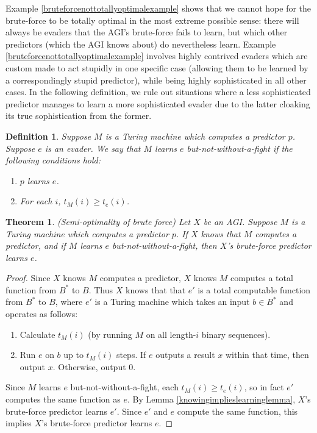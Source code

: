 \documentclass{article}
\newtheorem{definition}{Definition}
\newtheorem{theorem}{Theorem}
\begin{document}
Example \ref{bruteforcenottotallyoptimalexample} shows that we cannot
hope for the brute-force to be totally optimal in the most extreme possible sense:
there will always be evaders that the AGI's brute-force fails to learn, but which other
predictors (which the AGI knows about)
do nevertheless learn. Example \ref{bruteforcenottotallyoptimalexample} involves
highly contrived evaders which are custom made to act stupidly in one specific case
(allowing them to be learned by a correspondingly stupid predictor), while being
highly sophisticated in all other cases. In the following definition, we rule out
situations where a less sophisticated predictor manages to learn a
more sophisticated evader due to the latter cloaking its true sophistication from
the former.

\begin{definition}
    Suppose $M$ is a Turing machine which computes a predictor $p$.
    Suppose $e$ is an evader.
    We say that \emph{$M$ learns $e$ but-not-without-a-fight}
    if the following conditions hold:
    \begin{enumerate}
        \item $p$ learns $e$.
        \item For each $i$, $t_M(i)\geq t_e(i)$.
    \end{enumerate}
\end{definition}

\begin{theorem}
    (Semi-optimality of brute force)
    Let $X$ be an AGI.
    Suppose $M$ is a Turing machine which computes a predictor $p$.
    If $X$ knows that $M$ computes a predictor, and if $M$ learns $e$
    but-not-without-a-fight, then $X$'s brute-force predictor learns $e$.
\end{theorem}

\begin{proof}
    Since $X$ knows $M$ computes a predictor, $X$ knows $M$ computes a total
    function from $B^*$ to $B$. Thus $X$ knows that that $e'$ is a total
    computable function from $B^*$ to $B$, where $e'$ is a Turing machine which
    takes an input $b\in B^*$ and operates as follows:
    \begin{enumerate}
        \item
        Calculate $t_M(i)$ (by running $M$ on all length-$i$ binary sequences).
        \item
        Run $e$ on $b$ up to $t_M(i)$ steps. If $e$ outputs a result $x$ within that
        time, then output $x$. Otherwise, output $0$.
    \end{enumerate}
    Since $M$ learns $e$ but-not-without-a-fight, each $t_M(i)\geq t_e(i)$,
    so in fact $e'$ computes the same function as $e$.
    By Lemma \ref{knowingimplieslearninglemma}, $X$'s brute-force predictor
    learns $e'$. Since $e'$ and $e$ compute the same function, this implies
    $X$'s brute-force predictor learns $e$.
\end{proof}



\end{document}

